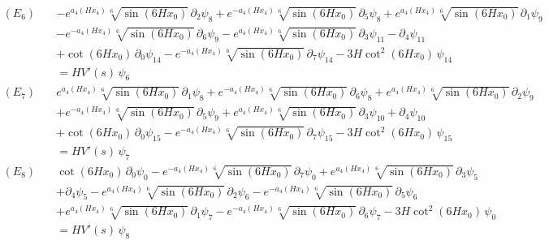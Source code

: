 \begin{align*}
(E_{6})\quad & -e^{a_4\left(H x_4\right)} \sqrt[6]{\sin \left(6 H x_0\right)}\,\partial_{2}\psi_{8} + e^{-a_4\left(H x_4\right)} \sqrt[6]{\sin \left(6 H x_0\right)}\,\partial_{5}\psi_{8} + e^{a_4\left(H x_4\right)} \sqrt[6]{\sin \left(6 H x_0\right)}\,\partial_{1}\psi_{9} \\
 &  - e^{-a_4\left(H x_4\right)} \sqrt[6]{\sin \left(6 H x_0\right)}\,\partial_{6}\psi_{9} - e^{a_4\left(H x_4\right)} \sqrt[6]{\sin \left(6 H x_0\right)}\,\partial_{3}\psi_{11} - \partial_{4}\psi_{11} \\
 &  + \cot \left(6 H x_0\right)\,\partial_{0}\psi_{14} - e^{-a_4\left(H x_4\right)} \sqrt[6]{\sin \left(6 H x_0\right)}\,\partial_{7}\psi_{14} - 3 H \cot ^2\left(6 H x_0\right)\,\psi_{14} \\
 & = H V'(s)\,\psi_{6}
\end{align*}
\begin{align*}
(E_{7})\quad & e^{a_4\left(H x_4\right)} \sqrt[6]{\sin \left(6 H x_0\right)}\,\partial_{1}\psi_{8} + e^{-a_4\left(H x_4\right)} \sqrt[6]{\sin \left(6 H x_0\right)}\,\partial_{6}\psi_{8} + e^{a_4\left(H x_4\right)} \sqrt[6]{\sin \left(6 H x_0\right)}\,\partial_{2}\psi_{9} \\
 &  + e^{-a_4\left(H x_4\right)} \sqrt[6]{\sin \left(6 H x_0\right)}\,\partial_{5}\psi_{9} + e^{a_4\left(H x_4\right)} \sqrt[6]{\sin \left(6 H x_0\right)}\,\partial_{3}\psi_{10} + \partial_{4}\psi_{10} \\
 &  + \cot \left(6 H x_0\right)\,\partial_{0}\psi_{15} - e^{-a_4\left(H x_4\right)} \sqrt[6]{\sin \left(6 H x_0\right)}\,\partial_{7}\psi_{15} - 3 H \cot ^2\left(6 H x_0\right)\,\psi_{15} \\
 & = H V'(s)\,\psi_{7}
\end{align*}
\begin{align*}
(E_{8})\quad & \cot \left(6 H x_0\right)\,\partial_{0}\psi_{0} - e^{-a_4\left(H x_4\right)} \sqrt[6]{\sin \left(6 H x_0\right)}\,\partial_{7}\psi_{0} + e^{a_4\left(H x_4\right)} \sqrt[6]{\sin \left(6 H x_0\right)}\,\partial_{3}\psi_{5} \\
 &  + \partial_{4}\psi_{5} - e^{a_4\left(H x_4\right)} \sqrt[6]{\sin \left(6 H x_0\right)}\,\partial_{2}\psi_{6} - e^{-a_4\left(H x_4\right)} \sqrt[6]{\sin \left(6 H x_0\right)}\,\partial_{5}\psi_{6} \\
 &  + e^{a_4\left(H x_4\right)} \sqrt[6]{\sin \left(6 H x_0\right)}\,\partial_{1}\psi_{7} - e^{-a_4\left(H x_4\right)} \sqrt[6]{\sin \left(6 H x_0\right)}\,\partial_{6}\psi_{7} - 3 H \cot ^2\left(6 H x_0\right)\,\psi_{0} \\
 & = H V'(s)\,\psi_{8}
\end{align*}
